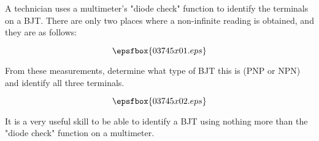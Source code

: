 

A technician uses a multimeter's "diode check" function to identify the terminals on a BJT.  There are only two places where a non-infinite reading is obtained, and they are as follows:

$$\epsfbox{03745x01.eps}$$

From these measurements, determine what type of BJT this is (PNP or NPN) and identify all three terminals.







$$\epsfbox{03745x02.eps}$$







It is a very useful skill to be able to identify a BJT using nothing more than the "diode check" function on a multimeter.





